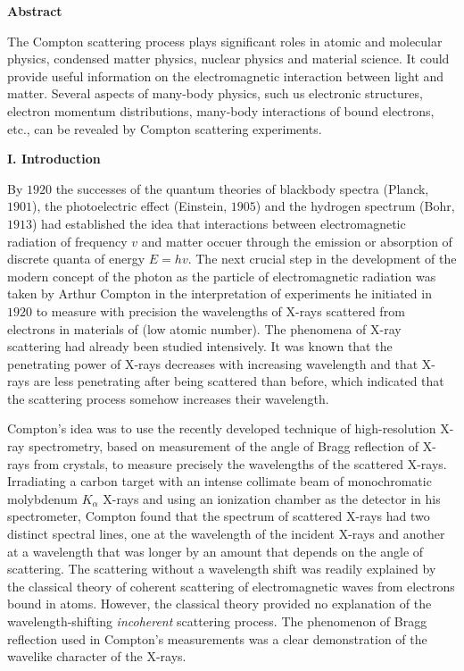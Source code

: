 \documentclass[fleqn]{article}
\begin{document}
  \textbf{Abstract}

  \vspace{10px}

  The Compton scattering process plays significant roles in atomic and molecular physics, condensed matter physics, nuclear physics and material science.
  It could provide useful information on the electromagnetic interaction between light and matter. Several aspects of many-body physics,
  such us electronic structures, electron momentum distributions, many-body interactions of bound electrons, etc., can be revealed by Compton scattering 
  experiments.

  \vspace{30px}

  \textbf{I. Introduction}

  \vspace{10px}

  By $1920$ the successes of the quantum theories of blackbody spectra (Planck, $1901$), the photoelectric effect (Einstein, $1905$) 
  and the hydrogen spectrum (Bohr, $1913$) had established the idea that interactions between electromagnetic radiation of frequency $v$ and matter
  occuer through the emission or absorption of discrete quanta of energy $E=hv$. The next crucial step in the development of the modern concept
  of the photon as the particle of electromagnetic radiation was taken by Arthur Compton in the interpretation 
  of experiments he initiated in $1920$ to measure with precision the wavelengths of X-rays scattered from electrons in materials of 
  (low atomic number). The phenomena of X-ray scattering had already been studied intensively. It was known that the 
  penetrating power of X-rays decreases with increasing wavelength and that X-rays are less penetrating after being scattered than 
  before, which indicated that the scattering process somehow increases their wavelength. 

  Compton’s idea was to use the recently developed 
  technique of high-resolution X-ray spectrometry, based on measurement of the angle of Bragg reflection of X-rays from crystals, 
  to measure precisely the wavelengths of the scattered X-rays. Irradiating a carbon target with an intense collimate beam of monochromatic molybdenum 
  $K_{\alpha}$ X-rays and using an ionization chamber as the detector in his spectrometer, Compton found that the
  spectrum of scattered X-rays had two distinct spectral lines, one at the wavelength of the incident X-rays and another at a wavelength that was 
  longer by an amount that depends on the angle of scattering. The scattering without a wavelength shift was readily explained by the classical theory 
  of coherent scattering of electromagnetic waves from electrons bound in atoms. However, the classical theory provided no explanation of the 
  wavelength-shifting \emph{incoherent} scattering process. The phenomenon of Bragg reflection used in Compton’s measurements was a clear demonstration 
  of the wavelike character of the X-rays. 
\end{document}
